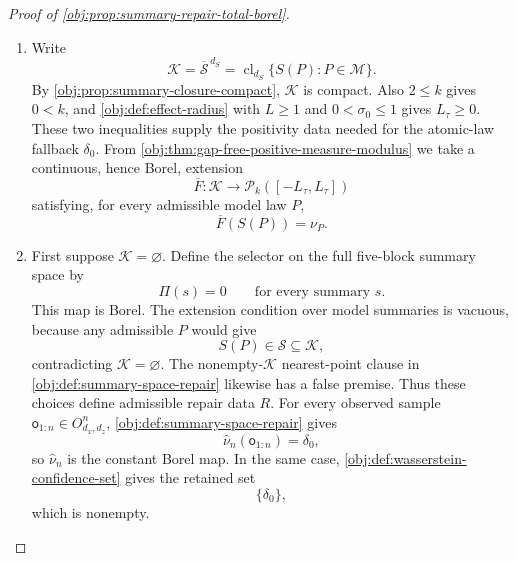 \begin{proof}[Proof of \cref{obj:prop:summary-repair-total-borel}]
\begin{enumerate}
\item Write
\[
\mathcal K=\overline{\mathscr S}^{\,d_S}
       =\operatorname{cl}_{d_S}\{S(P):P\in\mathcal M\}.
\]
By \cref{obj:prop:summary-closure-compact}, \(\mathcal K\) is compact.  Also \(2\le k\) gives \(0<k\), and \cref{obj:def:effect-radius} with \(L\ge 1\) and \(0<\sigma_0\le 1\) gives \(L_\tau\ge 0\).  These two inequalities supply the positivity data needed for the atomic-law fallback \(\delta_0\).  From \cref{obj:thm:gap-free-positive-measure-modulus} we take a continuous, hence Borel, extension
\[
\overline F:\mathcal K\longrightarrow \mathcal P_k([-L_\tau,L_\tau])
\]
satisfying, for every admissible model law \(P\),
\[
\overline F(S(P))=\nu_P .
\]
\hfill{}%

\item First suppose \(\mathcal K=\varnothing\).  Define the selector on the full five-block summary space by
\[
\Pi(s)=0\qquad\text{for every summary }s .
\]
This map is Borel.  The extension condition over model summaries is vacuous, because any admissible \(P\) would give
\[
S(P)\in\mathscr S\subseteq \mathcal K,
\]
contradicting \(\mathcal K=\varnothing\).  The nonempty-\(\mathcal K\) nearest-point clause in \cref{obj:def:summary-space-repair} likewise has a false premise.  Thus these choices define admissible repair data \(R\).  For every observed sample \(\mathsf o_{1:n}\in O_{d_x,d_z}^n\), \cref{obj:def:summary-space-repair} gives
\[
\widehat\nu_n(\mathsf o_{1:n})
=\delta_0,
\]
so \(\widehat\nu_n\) is the constant Borel map.  In the same case, \cref{obj:def:wasserstein-confidence-set} gives the retained set
\[
\{\delta_0\},
\]
which is nonempty. \hfill{}%


\end{enumerate}
\end{proof}
